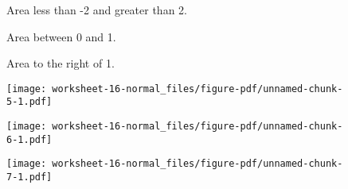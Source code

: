 \documentclass[
  letterpaper,
  DIV=11,
  numbers=noendperiod]{scrartcl}
\begin{document}
\begin{figure}

\begin{minipage}[t]{0.33\linewidth}

{\centering 

Area less than -2 and greater than 2.

}

\end{minipage}%
%
\begin{minipage}[t]{0.33\linewidth}

{\centering 

Area between 0 and 1.

}

\end{minipage}%
%
\begin{minipage}[t]{0.33\linewidth}

{\centering 

Area to the right of 1.

}

\end{minipage}%
\newline
\begin{minipage}[t]{0.33\linewidth}

{\centering 

\texttt{[image: worksheet-16-normal\_files/figure-pdf/unnamed-chunk-5-1.pdf]}

}

\end{minipage}%
%
\begin{minipage}[t]{0.33\linewidth}

{\centering 

\texttt{[image: worksheet-16-normal\_files/figure-pdf/unnamed-chunk-6-1.pdf]}

}

\end{minipage}%
%
\begin{minipage}[t]{0.33\linewidth}

{\centering 

\texttt{[image: worksheet-16-normal\_files/figure-pdf/unnamed-chunk-7-1.pdf]}

}

\end{minipage}%
\newline
\begin{minipage}[t]{0.33\linewidth}

{\centering 

\(\quad\)

}
\end{minipage}
\end{figure}
\end{document}
